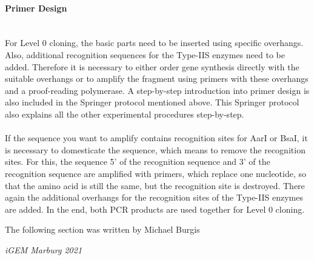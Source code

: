 \paragraph{Primer Design} \mbox{} \\
For Level 0 cloning, the basic parts need to be inserted using specific overhangs. Also, additional recognition sequences for the Type-IIS enzymes need to be added. Therefore it is necessary to either order gene synthesis directly with the suitable overhangs or to amplify the fragment using primers with these overhangs and a proof-reading polymerase. A step-by-step introduction into primer design is also included in the Springer protocol mentioned above. This Springer protocol also explains all the other experimental procedures step-by-step. \\ \\
If the sequence you want to amplify contains recognition sites for AarI or BsaI, it is necessary to domesticate the sequence, which means to remove the recognition sites. For this, the sequence 5’ of the recognition sequence and 3’ of the recognition sequence are amplified with primers, which replace one nucleotide, so that the amino acid is still the same, but the recognition site is destroyed. There again the additional overhangs for the recognition sites of the Type-IIS enzymes are added. In the end, both PCR products are used together for Level 0 cloning.

\epigraph{The following section was written by Michael Burgis}{\textit{iGEM Marburg 2021}}
